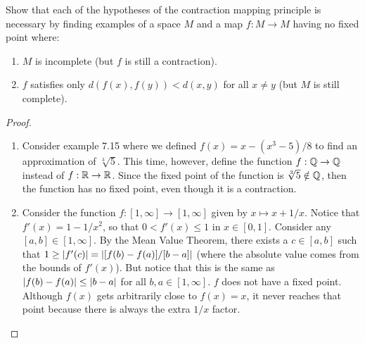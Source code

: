 \begin{exercise}{43}
Show that each of the hypotheses of the contraction mapping principle is necessary by finding examples of a space $M$ and a map $f:M\to M$ having no fixed point where:
\begin{enumerate}
    \item $M$ is incomplete (but $f$ is still a contraction).
    \item $f$ satisfies only $d(f(x),f(y))<d(x,y)$ for all $x\neq y$ (but $M$ is still complete).
\end{enumerate}
\end{exercise}
\begin{proof}
\begin{enumerate}
    \item Consider example 7.15 where we defined $f(x)=x-(x^3-5)/8$ to find an approximation of $\sqrt[3]{5}$.
    This time, however, define the function $f:\mathbb{Q}\to\mathbb{Q}$ instead of $f:\mathbb{R}\to\mathbb{R}$.
    Since the fixed point of the function is $\sqrt[3]{5}\notin\mathbb{Q}$, then the function has no fixed point, even though it is a contraction.
    \item Consider the function $f:[1,\infty]\to[1,\infty]$ given by $x\mapsto x+1/x$.
    Notice that $f'(x) = 1-1/x^2$, so that $0<f'(x)\leq 1$ in $x\in[0,1]$.
    Consider any $[a,b]\in [1,\infty]$.
    By the Mean Value Theorem, there exists a $c\in[a,b]$ such that $1\geq \left\lvert f'(c)\right\rvert = \left\lvert [f(b)-f(a)]/[b-a]\right\rvert$ (where the absolute value comes from the bounds of $f'(x)$).
    But notice that this is the same as $\left\lvert f(b)-f(a)\right\rvert\leq \left\lvert b-a\right\rvert$ for all $b,a\in[1,\infty]$.
    $f$ does not have a fixed point.
    Although $f(x)$ gets arbitrarily close to $f(x)=x$, it never reaches that point because there is always the extra $1/x$ factor.
\end{enumerate}
\end{proof} 
